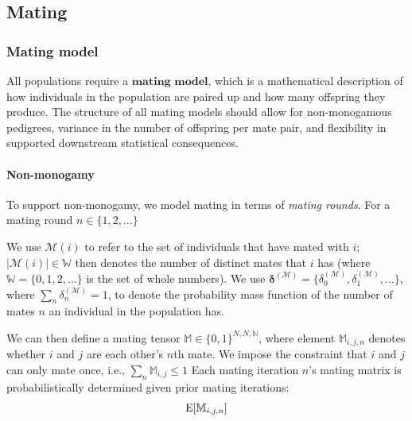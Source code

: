 \documentclass[12pt]{article}
\numberwithin{equation}{section}
\begin{document}
\subsection{Mating}


\subsubsection{Mating model}




All populations require a $\textbf{mating model}$, which is a mathematical description of how individuals in the population are paired up and how many offspring they produce.
The structure of all mating models should allow for non-monogamous pedigrees, variance in the number of offspring per mate pair, and flexibility in supported downstream statistical consequences.

\paragraph{Non-monogamy}
To support non-monogamy, we model mating in terms of \emph{mating rounds}.
For a mating round $n \in \{1, 2, ...\}$

We use $\mathcal{M}(i)$ to refer to the set of individuals that have mated with $i$;
$|\mathcal{M}(i)| \in \mathbb{W}$ then denotes the number of distinct mates that $i$ has (where $\mathbb{W} = \{0, 1, 2, ...\}$ is the set of whole numbers).
We use $\mathbf{ \delta}^{\mathcal{(M)}} = \{ \delta^{\mathcal{(M)}}_0, \delta^{\mathcal{(M)}}_1, ... \}$, where $\sum_n \delta^{\mathcal{(M)}}_n = 1$, to denote the probability mass function of the number of mates $n$ an individual in the population has.

We can then define a mating tensor $\mathbb{M} \in \{0,1\}^{N,N,\mathbb{N}}$, where element $\mathbb{M}_{i,j,n}$ denotes whether $i$ and $j$ are each other's $n$th mate.
We impose the constraint that $i$ and $j$ can only mate once, i.e., $\sum_n \mathbb{M}_{i,j} \leq 1$
Each mating iteration $n$'s mating matrix is probabilistically determined given prior mating iterations:
$$
\mathrm{E}[\mathbb{M}_{i,j,n}]
$$
\end{document}
